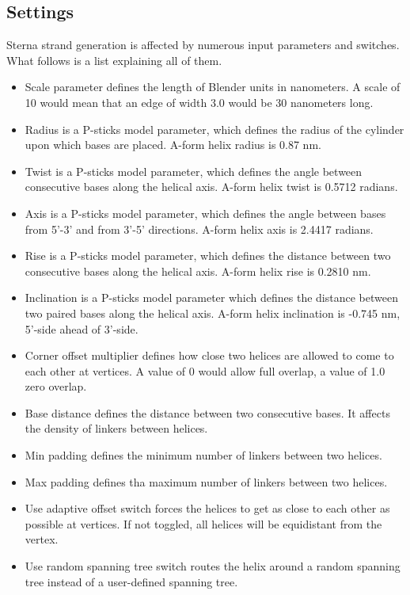   \subsection{Settings}
    Sterna strand generation is affected by numerous input parameters and switches. What follows is a list explaining all of them.
    \begin{itemize}
      \item Scale parameter defines the length of Blender units in nanometers. A scale of 10 would mean that an edge of width 3.0 would be 30 nanometers long.
      \item Radius is a P-sticks model parameter, which defines the radius of the cylinder upon which bases are placed. A-form helix radius is 0.87 nm.
      \item Twist is a P-sticks model parameter, which defines the angle between consecutive bases along the helical axis. A-form helix twist is 0.5712 radians.
      \item Axis is a P-sticks model parameter, which defines the angle between bases from 5'-3' and from 3'-5' directions. A-form helix axis is 2.4417 radians.
      \item Rise is a P-sticks model parameter, which defines the distance between two consecutive bases along the helical axis. A-form helix rise is 0.2810 nm.
      \item Inclination is a P-sticks model parameter which defines the distance between two paired bases along the helical axis. A-form helix inclination is -0.745 nm, 5'-side ahead of 3'-side.
      \item Corner offset multiplier defines how close two helices are allowed to come to each other at vertices. A value of 0 would allow full overlap, a value of 1.0 zero overlap.
      \item Base distance defines the distance between two consecutive bases. It affects the density of linkers between helices.
      \item Min padding defines the minimum number of linkers between two helices.
      \item Max padding defines tha maximum number of linkers between two helices.
      \item Use adaptive offset switch forces the helices to get as close to each other as possible at vertices. If not toggled, all helices will be equidistant from the vertex.
      \item Use random spanning tree switch routes the helix around a random spanning tree instead of a user-defined spanning tree.

\end{itemize}
